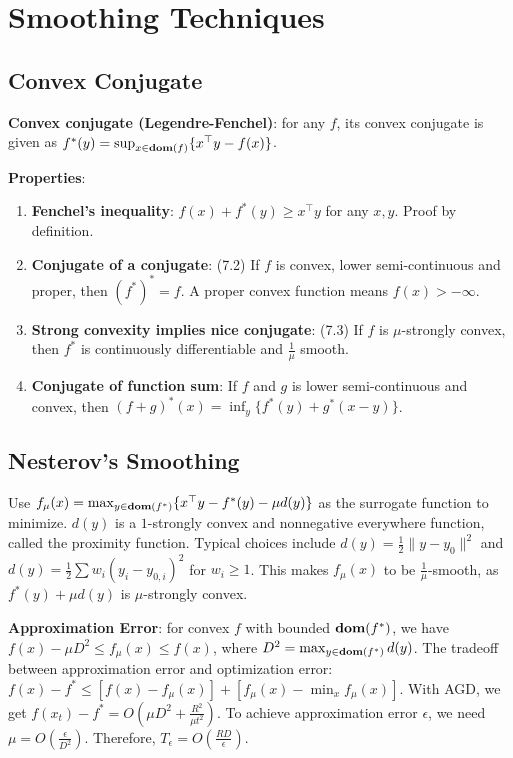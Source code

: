 \section{Smoothing Techniques}


\subsection{Convex Conjugate}
\textbf{Convex conjugate (Legendre-Fenchel)}: for any $f$, its convex conjugate is given as $f^*(y) = \sup_{x\in \operatorname{\textbf{dom}}(f)} \{x^\top y - f(x)\}$.

\textbf{Properties}:
\begin{enumerate}
    \item \textbf{Fenchel's inequality}: $f(x)+f^*(y) \ge x^\top y$ for any $x, y$. Proof by definition.
    \item \textbf{Conjugate of a conjugate}: (7.2) If $f$ is convex, lower semi-continuous and proper, then $(f^*)^* = f$. A proper convex function means $f(x)>-\infty$.
    \item \textbf{Strong convexity implies nice conjugate}: (7.3) If $f$ is $\mu$-strongly convex, then $f^*$ is continuously differentiable and $\frac{1}{\mu}$ smooth.
    \item \textbf{Conjugate of function sum}: If $f$ and $g$ is lower semi-continuous and convex, then $(f+g)^*(x) = \inf_y\{f^*(y)+g^*(x-y)\}$.
\end{enumerate}

\subsection{Nesterov's Smoothing}
Use $f_\mu(x) = \max_{y \in \operatorname{\textbf{dom}}(f^*)} \{x^\top y - f^*(y) - \mu d(y)\}$ as the surrogate function to minimize. $d(y)$ is a $1$-strongly convex and nonnegative everywhere function, called the proximity function. Typical choices include $d(y) = \frac{1}{2}\|y-y_0\|^2$ and $d(y) = \frac{1}{2}\sum w_i(y_i - y_{0,i})^2$ for $w_i\ge 1$. This makes $f_\mu(x)$ to be $\frac{1}{\mu}$-smooth, as $f^*(y)+\mu d(y)$ is $\mu$-strongly convex.

\textbf{Approximation Error}: for convex $f$ with bounded $\operatorname{\textbf{dom}}(f^*)$, we have $f(x)-\mu D^2 \le f_\mu(x) \le f(x)$, where $D^2 = \max_{y\in\operatorname{\textbf{dom}}(f^*)} d(y)$. The tradeoff between approximation error and optimization error: $f(x) - f^* \le [f(x) - f_\mu(x)] + [f_\mu(x) - \min_x f_\mu(x)]$. With AGD, we get $f(x_t)- f^* = O(\mu D^2 + \frac{R^2}{\mu t^2})$. To achieve approximation error $\epsilon$, we need $\mu = O(\frac{\epsilon}{D^2})$. Therefore, $T_\epsilon = O(\frac{RD}{\epsilon})$.

